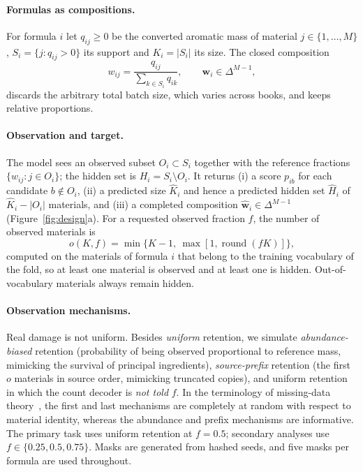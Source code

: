 \documentclass[10pt,a4paper]{article}
\makeatletter
\renewcommand{\subsection}{\@startsection{subsection}{2}{0pt}{9pt plus 2pt}{4pt}{\normalfont\normalsize\itshape}}
\makeatother
\begin{document}
\subsection{The Completion Task}
\label{sec:task}

\paragraph{Formulas as compositions.} For formula $i$ let $q_{ij}\ge0$ be the converted aromatic mass of material $j\in\{1,\dots,M\}$, $S_i=\{j:q_{ij}>0\}$ its support and $K_i=|S_i|$ its size. The closed composition~\cite{aitchison1982}
\begin{equation}
w_{ij}=\frac{q_{ij}}{\sum_{k\in S_i}q_{ik}},\qquad \bm w_i\in\Delta^{M-1},
\label{eq:closure}
\end{equation}
discards the arbitrary total batch size, which varies across books, and keeps relative proportions.

\paragraph{Observation and target.} The model sees an observed subset $O_i\subset S_i$ together with the reference fractions $\{w_{ij}:j\in O_i\}$; the hidden set is $H_i=S_i\setminus O_i$. It returns (i) a score $p_{ib}$ for each candidate $b\notin O_i$, (ii) a predicted size $\widehat K_i$ and hence a predicted hidden set $\widehat H_i$ of $\widehat K_i-|O_i|$ materials, and (iii) a completed composition $\widehat{\bm w}_i\in\Delta^{M-1}$ (Figure~\ref{fig:design}a). For a requested observed fraction $f$, the number of observed materials is
\begin{equation}
o(K,f)=\min\bigl\{K-1,\ \max[1,\operatorname{round}(fK)]\bigr\},
\label{eq:maskcount}
\end{equation}
computed on the materials of formula $i$ that belong to the training vocabulary of the fold, so at least one material is observed and at least one is hidden. Out-of-vocabulary materials always remain hidden.

\paragraph{Observation mechanisms.} Real damage is not uniform. Besides \emph{uniform} retention, we simulate \emph{abundance-biased} retention (probability of being observed proportional to reference mass, mimicking the survival of principal ingredients), \emph{source-prefix} retention (the first $o$ materials in source order, mimicking truncated copies), and uniform retention in which the count decoder is \emph{not told} $f$. In the terminology of missing-data theory~\cite{rubin1976}, the first and last mechanisms are completely at random with respect to material identity, whereas the abundance and prefix mechanisms are informative. The primary task uses uniform retention at $f=0.5$; secondary analyses use $f\in\{0.25,0.5,0.75\}$. Masks are generated from hashed seeds, and five masks per formula are used throughout.
\end{document}
